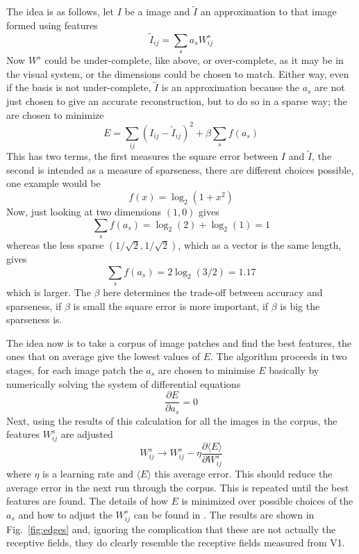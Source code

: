 \documentclass[11pt,a4paper]{scrartcl}
\begin{document}
The idea is as follows, let $I$ be a image and $\tilde{I}$ an approximation to that image formed using features
\begin{equation}
\tilde{I}_{ij}=\sum_{s}a_sW^s_{ij}
\end{equation}
Now $W^s$ could be under-complete, like above, or over-complete, as it
may be in the visual system, or the dimensions could be chosen to match. Either way, even if the basis is not under-complete, $\tilde{I}$ is an approximation because the $a_s$ are not just chosen to give an accurate reconstruction, but to do so in a sparse way; the are chosen to minimize
\begin{equation}
E=\sum_{ij}(I_{ij}-\tilde{I}_{ij})^2+\beta\sum_s f(a_s)
\end{equation}
This has two terms, the first measures the square error between $I$ and $\tilde{I}$, the second is intended as a measure of sparseness, there are different choices possible, one example would be
\begin{equation}
f(x)=\log_2(1+x^2)
\end{equation}
Now, just looking at two dimensions $(1,0)$ gives
\begin{equation}
\sum_sf(a_s)=\log_2{(2)}+\log_2(1)=1
\end{equation}
whereas the less sparse $(1/\sqrt{2},1/\sqrt{2})$, which as a vector
is the same length, gives
\begin{equation}
\sum_sf(a_s)=2\log_2(3/2)=1.17
\end{equation}
which is larger. The $\beta$ here determines the trade-off between
accuracy and sparseness, if $\beta$ is small the square error is more
important, if $\beta$ is big the sparseness is.

The idea now is to take a corpus of image patches and find the best
features, the ones that on average give the lowest values of $E$. The
algorithm proceeds in two stages, for each image patch the $a_s$ are
chosen to minimise $E$ basically by numerically solving the system of differential equations
\begin{equation}
\frac{\partial E}{\partial a_s}=0
\end{equation}
Next, using the results of this calculation for all the images in the
corpus, the features $W^s_{ij}$ are adjusted 
\begin{equation}
W^s_{ij}\rightarrow W^s_{ij}-\eta \frac{\partial \langle E\rangle}{\partial W^s_{ij}}
\end{equation}
where $\eta$ is a learning rate and $\langle E\rangle$ this average
error. This should reduce the average error in the next run through
the corpus. This is repeated until the best features are found. The
details of how $E$ is minimized over possible choices of the $a_s$ and
how to adjust the $W^s_{ij}$ can be found in
\cite{OlshausenField1996a,OlshausenField1997a}. The results are shown
in Fig.~\ref{fig:edges} and, ignoring the complication that these are
not actually the receptive fields, they do clearly resemble the
receptive fields measured from V1.
\end{document}
